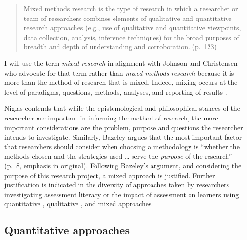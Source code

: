 \documentclass[
]{book}
\begin{document}
\begin{quote}
Mixed methods research is the type of research in which a researcher or team of researchers combines elements of qualitative and quantitative research approaches (e.g., use of qualitative and quantitative viewpoints, data collection, analysis, inference techniques) for the broad purposes of breadth and depth of understanding and corroboration. (p.~123)
\end{quote}

I will use the term \emph{mixed research} in alignment with Johnson and Christensen \citeyearpar{johnsonEducationalResearchQuantitative2017} who advocate for that term rather than \emph{mixed methods research} because it is more than the method of research that is mixed. Indeed, mixing occurs at the level of paradigms, questions, methods, analyses, and reporting of results \citep{bazeleyIntegratingAnalysesMixed2018}.

Niglas \citeyearpar{niglasMultidimensionalModelResearch2010} contends that while the epistemological and philosophical stances of the researcher are important in informing the method of research, the more important considerations are the problem, purpose and questions the researcher intends to investigate. Similarly, Bazeley \citeyearpar{bazeleyIntegratingAnalysesMixed2018} argues that the most important factor that researchers should consider when choosing a methodology is ``whether the methods chosen and the strategies used \ldots{} serve the \emph{purpose} of the research'' (p.~8, emphasis in original). Following Bazeley's argument, and considering the purpose of this research project, a mixed approach is justified. Further justification is indicated in the diversity of approaches taken by researchers investigating assessment literacy or the impact of assessment on learners using quantitative \citep{delucaTeachersApproachesClassroom2016, delucaExploringAssessmentCultures2021, masseyAssessmentLiteracyCollege2020, nayaginPreserviceTeachersApproaches2020, pereiraHowUndergraduatesPerceive2021}, qualitative \citep{boudWhatFeedbackLiterate2021, coombsSeaSeaCanadian2020, delucaPedagogySlowSignificant2021, earleBalancingDemandsValidity2020, fivesNavigatingComplexCognitive2020, medlandAssessmentIlliterateShared2019, watsonSmallDataOnline2017}, and mixed \citep{delucaStudentPerspectivesAssessment2018, nicholsonEnhancingStudentEngagement2018, iannoneImpactHighStakes2020, tekirAlignmentIntendedEnacted2021} approaches.

\hypertarget{quantitative-approaches}{%
\subsection{Quantitative approaches}\label{quantitative-approaches}}
\end{document}
